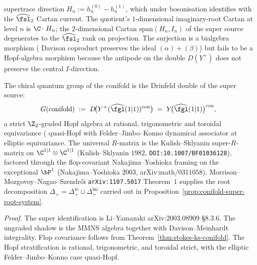 \begin{theorem}
\begin{enumerate}[label=\textup{(\alph*)}]
supertrace direction $H_n := h^{(0)}_n - h^{(1)}_n$, which under
bosonisation identifies with the $\widehat{\fsl}_2$ Cartan current.
The quotient's $1$-dimensional imaginary-root Cartan at level $n$ is
$\C \cdot H_n$; the $2$-dimensional Cartan $\mathrm{span}(H_n, I_n)$
of the super source degenerates to the $\widehat{\fsl}_2$ rank on
projection. The surjection is a bialgebra morphism \textup{(}
Davison coproduct preserves the ideal $(\alpha) + (\beta)$\textup{)}
but fails to be a Hopf-algebra morphism because the antipode on the
double $D(Y^+)$ does not preserve the central $I$-direction.
\end{enumerate}
The chiral quantum group of the conifold is the Drinfeld double of the
super source:
\[
 G(\mathrm{conifold}) \;:=\; D\!\bigl(Y^+(\widehat{\fgl}(1|1))^{\mathrm{con}}\bigr)
 \;=\; Y\!\bigl(\widehat{\fgl}(1|1)\bigr)^{\mathrm{con}},
\]
a strict $\Z_2$-graded Hopf algebra at rational, trigonometric and
toroidal equivariance \textup{(} quasi-Hopf with
Felder--Jimbo--Konno dynamical associator at elliptic equivariance.
The universal $R$-matrix is the Kulish--Sklyanin super-$R$-matrix on
$\C^{1|1} \otimes \C^{1|1}$ \textup{(}Kulish--Sklyanin $1982$,
\texttt{DOI:10.1007/BF01036128}\textup{),} factored through the
flop-covariant Nakajima--Yoshioka framing on the exceptional $\bP^1$
\textup{(}Nakajima--Yoshioka $2003$, arXiv:math/$0311058$\textup{).}
Morrison--Mozgovoy--Nagao--Szendr\H{o}i \texttt{arXiv:1107.5017}
Theorem~$1$ supplies the root decomposition
$\Delta_+ = \Delta_+^{\mathrm{re}} \sqcup \Delta_+^{\mathrm{im}}$
carried out in Proposition~\textup{\ref{prop:conifold-super-root-system}}.
\end{theorem}
\noindent\emph{Proof.} The super identification is Li--Yamazaki arXiv:2003.08909 \S8.3.6. The ungraded shadow is the MMNS algebra together with Davison--Meinhardt integrality. Flop covariance follows from Theorem~\ref{thm:stokes-ks-conifold}. The Hopf stratification is rational, trigonometric, and toroidal strict, with the elliptic Felder--Jimbo--Konno case quasi-Hopf.

